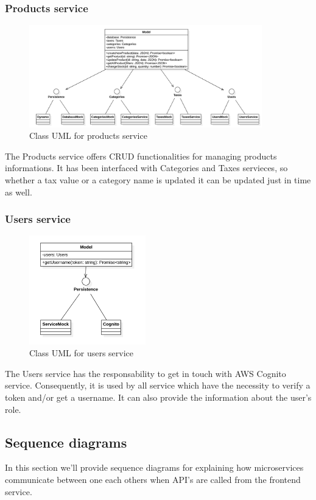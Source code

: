 \subsubsection{Products service}
\begin{figure}[H]
    \includegraphics[width=0.9\textwidth]{res/images/class-diagrams/products.png}
    \caption{Class UML for products service}
\end{figure}
The Products service offers CRUD functionalities for managing products informations. It has been interfaced with Categories and Taxes servieces, so whether a tax value or a category name
is updated it can be updated just in time as well.

\subsubsection{Users service}
\begin{figure}[H]
    \includegraphics[width=0.45\textwidth]{res/images/class-diagrams/users.png}
    \caption{Class UML for users service}
\end{figure}
The Users service has the responsability to get in touch with AWS Cognito service. Consequently, it is used by all service which have the necessity to verify
a token and/or get a username. It can also provide the information about the user's role.


\subsection{Sequence diagrams} \label{_sequenceDiagram}
In this section we'll provide sequence diagrams for explaining how microservices communicate between one each others when API's are called from the frontend service.

